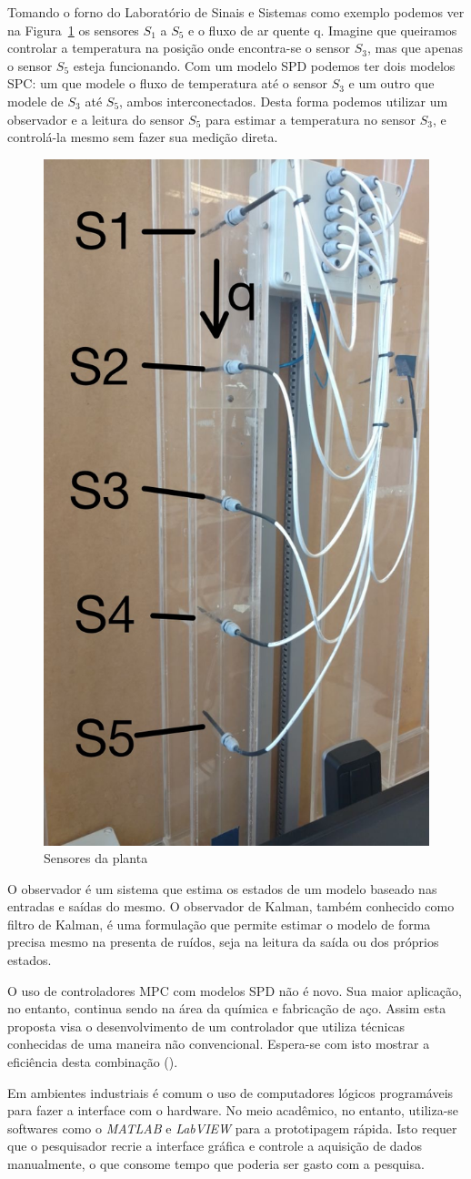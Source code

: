 Tomando o forno do Laboratório de Sinais e Sistemas como exemplo podemos ver na
Figura~\ref{fig:sensors-spd} os sensores \(S_1\) a \(S_5\) e o fluxo de ar
quente q. Imagine que queiramos controlar a temperatura na posição onde
encontra-se o sensor \(S_3\), mas que apenas o sensor \(S_5\) esteja
funcionando. Com um modelo SPD podemos ter dois modelos SPC\@: um que modele o
fluxo de temperatura até o sensor \(S_3\) e um outro que modele de \(S_3\) até
\(S_5\), ambos interconectados. Desta forma podemos utilizar um observador e a
leitura do sensor \(S_5\) para estimar a temperatura no sensor \(S_3\), e
controlá-la mesmo sem fazer sua medição direta.

\begin{figure}[ht!]
    \centering
    \captionsetup{justification=centering}
    \includegraphics[height=0.5\linewidth]{imgs/planta-spd}
    \caption{Sensores da planta}%
    \label{fig:sensors-spd}
\end{figure}

O observador é um sistema que estima os estados de um modelo baseado nas
entradas e saídas do mesmo. O observador de Kalman, também conhecido como filtro
de Kalman, é uma formulação que permite estimar o modelo de forma precisa mesmo
na presenta de ruídos, seja na leitura da saída ou dos próprios estados.

O uso de controladores MPC com modelos SPD não é novo. Sua maior aplicação, no
entanto, continua sendo na área da química e fabricação de aço. Assim esta
proposta visa o desenvolvimento de um controlador que utiliza técnicas
conhecidas de uma maneira não convencional. Espera-se com isto mostrar a
eficiência desta combinação (\textcite{article:shang}).

Em ambientes industriais é comum o uso de computadores lógicos programáveis para
fazer a interface com o hardware. No meio acadêmico, no entanto, utiliza-se
softwares como o \textit{MATLAB} e \textit{LabVIEW} para a prototipagem rápida.
Isto requer que o pesquisador recrie a interface gráfica e controle a aquisição
de dados manualmente, o que consome tempo que poderia ser gasto com a pesquisa.

